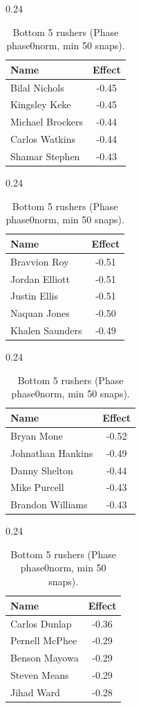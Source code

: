 \begin{table}[h!]
\centering
\begin{subtable}{0.24\textwidth}
\centering
\footnotesize
\begin{tabular}{lc}
\toprule
Name & Effect \\
\midrule
Bilal Nichols & -0.45 \\
Kingsley Keke & -0.45 \\
Michael Brockers & -0.44 \\
Carlos Watkins & -0.44 \\
Shamar Stephen & -0.43 \\
\bottomrule
\end{tabular}
\caption{DE}
\end{subtable}
\hfill
\begin{subtable}{0.24\textwidth}
\centering
\footnotesize
\begin{tabular}{lc}
\toprule
Name & Effect \\
\midrule
Bravvion Roy & -0.51 \\
Jordan Elliott & -0.51 \\
Justin Ellis & -0.51 \\
Naquan Jones & -0.50 \\
Khalen Saunders & -0.49 \\
\bottomrule
\end{tabular}
\caption{DT}
\end{subtable}
\hfill
\begin{subtable}{0.24\textwidth}
\centering
\footnotesize
\begin{tabular}{lc}
\toprule
Name & Effect \\
\midrule
Bryan Mone & -0.52 \\
Johnathan Hankins & -0.49 \\
Danny Shelton & -0.44 \\
Mike Purcell & -0.43 \\
Brandon Williams & -0.43 \\
\bottomrule
\end{tabular}
\caption{NT}
\end{subtable}
\hfill
\begin{subtable}{0.24\textwidth}
\centering
\footnotesize
\begin{tabular}{lc}
\toprule
Name & Effect \\
\midrule
Carlos Dunlap & -0.36 \\
Pernell McPhee & -0.29 \\
Benson Mayowa & -0.29 \\
Steven Means & -0.29 \\
Jihad Ward & -0.28 \\
\bottomrule
\end{tabular}
\caption{OLB}
\end{subtable}
\caption{Bottom 5 rushers (Phase phase0norm, min 50 snaps).}
\label{tab:rusher_pm_phase0norm_bot}
\end{table}
